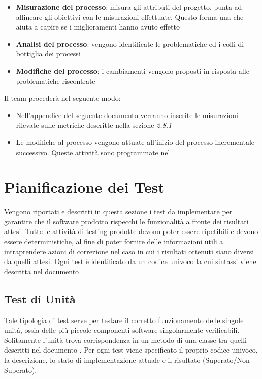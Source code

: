 {  \begin{itemize}
  \item \textbf{Misurazione del processo}: misura gli attributi del progetto, punta ad allineare gli
    obiettivi con le misurazioni effettuate. Questo forma una  che aiuta a capire se i
    miglioramenti hanno avuto effetto
  \item \textbf{Analisi del processo}: vengono identificate le problematiche ed i colli di bottiglia dei
    processi
  \item \textbf{Modifiche del processo}: i cambiamenti vengono proposti in risposta alle problematiche
    riscontrate
  \end{itemize}
  Il team procederà nel seguente modo:
  \begin{itemize}
  \item Nell'appendice del seguente documento verranno inserite le misurazioni
    rilevate sulle metriche descritte nella sezione \emph{2.8.1}
  \item Le modifiche al processo vengono attuate all’inizio del processo incrementale successivo.
    Queste attività sono programmate nel  \emph{\pianodiprogetto}
  \end{itemize}

\section{Pianificazione dei Test}

Vengono riportati e descritti in questa sezione i test da implementare per garantire che il
software prodotto rispecchi le funzionalità a fronte dei risultati attesi. 
Tutte le attività di testing prodotte devono poter essere ripetibili e
devono essere deterministiche, al fine di poter fornire delle
informazioni utili a intraprendere azioni di correzione nel caso in
cui i risultati ottenuti siano diversi da quelli attesi. 
Ogni test è identificato da un codice univoco la cui sintassi viene descritta nel documento \normediprogetto

\subsection{Test di Unità}

Tale tipologia di test serve per testare il corretto funzionamento
delle singole unità, ossia delle più piccole componenti software
singolarmente verificabili. Solitamente l’unità trova corrispondenza
in un metodo di una classe tra quelli descritti nel documento
. Per ogni test viene specificato il proprio
codice univoco, la descrizione, lo stato di implementazione attuale e
il risultato (Superato/Non Superato). 

}
